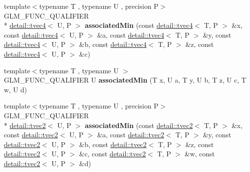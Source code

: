 \begin{DoxyCompactItemize}
\item 
\hypertarget{namespaceglm_a18facea65271c205a884578e54d8670f}{{\footnotesize template$<$typename T , typename U , precision P$>$ }\\G\-L\-M\-\_\-\-F\-U\-N\-C\-\_\-\-Q\-U\-A\-L\-I\-F\-I\-E\-R \\*
\hyperlink{structglm_1_1detail_1_1tvec4}{detail\-::tvec4}$<$ U, P $>$ {\bfseries associated\-Min} (const \hyperlink{structglm_1_1detail_1_1tvec4}{detail\-::tvec4}$<$ T, P $>$ \&x, const \hyperlink{structglm_1_1detail_1_1tvec4}{detail\-::tvec4}$<$ U, P $>$ \&a, const \hyperlink{structglm_1_1detail_1_1tvec4}{detail\-::tvec4}$<$ T, P $>$ \&y, const \hyperlink{structglm_1_1detail_1_1tvec4}{detail\-::tvec4}$<$ U, P $>$ \&b, const \hyperlink{structglm_1_1detail_1_1tvec4}{detail\-::tvec4}$<$ T, P $>$ \&z, const \hyperlink{structglm_1_1detail_1_1tvec4}{detail\-::tvec4}$<$ U, P $>$ \&c)}\label{namespaceglm_a18facea65271c205a884578e54d8670f}

\item 
\hypertarget{namespaceglm_a56ba6db426e264cc11b87d4603a89d48}{{\footnotesize template$<$typename T , typename U $>$ }\\G\-L\-M\-\_\-\-F\-U\-N\-C\-\_\-\-Q\-U\-A\-L\-I\-F\-I\-E\-R U {\bfseries associated\-Min} (T x, U a, T y, U b, T z, U c, T w, U d)}\label{namespaceglm_a56ba6db426e264cc11b87d4603a89d48}

\item 
\hypertarget{namespaceglm_af41a217c135ae0278cce57ab86379752}{{\footnotesize template$<$typename T , typename U , precision P$>$ }\\G\-L\-M\-\_\-\-F\-U\-N\-C\-\_\-\-Q\-U\-A\-L\-I\-F\-I\-E\-R \\*
\hyperlink{structglm_1_1detail_1_1tvec2}{detail\-::tvec2}$<$ U, P $>$ {\bfseries associated\-Min} (const \hyperlink{structglm_1_1detail_1_1tvec2}{detail\-::tvec2}$<$ T, P $>$ \&x, const \hyperlink{structglm_1_1detail_1_1tvec2}{detail\-::tvec2}$<$ U, P $>$ \&a, const \hyperlink{structglm_1_1detail_1_1tvec2}{detail\-::tvec2}$<$ T, P $>$ \&y, const \hyperlink{structglm_1_1detail_1_1tvec2}{detail\-::tvec2}$<$ U, P $>$ \&b, const \hyperlink{structglm_1_1detail_1_1tvec2}{detail\-::tvec2}$<$ T, P $>$ \&z, const \hyperlink{structglm_1_1detail_1_1tvec2}{detail\-::tvec2}$<$ U, P $>$ \&c, const \hyperlink{structglm_1_1detail_1_1tvec2}{detail\-::tvec2}$<$ T, P $>$ \&w, const \hyperlink{structglm_1_1detail_1_1tvec2}{detail\-::tvec2}$<$ U, P $>$ \&d)}\label{namespaceglm_af41a217c135ae0278cce57ab86379752}


\end{DoxyCompactItemize}
